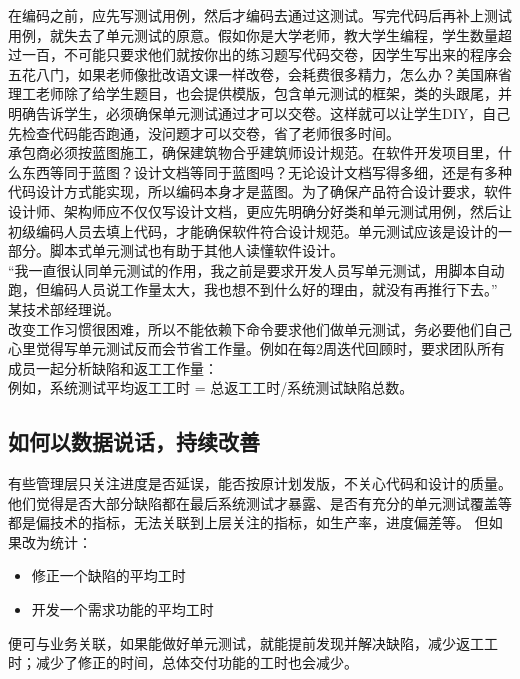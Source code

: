 在编码之前，应先写测试用例，然后才编码去通过这测试。写完代码后再补上测试用例，就失去了单元测试的原意。假如你是大学老师，教大学生编程，学生数量超过一百，不可能只要求他们就按你出的练习题写代码交卷，因学生写出来的程序会五花八门，如果老师像批改语文课一样改卷，会耗费很多精力，怎么办？美国麻省理工老师除了给学生题目，也会提供模版，包含单元测试的框架，类的头跟尾，并明确告诉学生，必须确保单元测试通过才可以交卷。这样就可以让学生DIY，自己先检查代码能否跑通，没问题才可以交卷，省了老师很多时间。\\
承包商必须按蓝图施工，确保建筑物合乎建筑师设计规范。在软件开发项目里，什么东西等同于蓝图？设计文档等同于蓝图吗？无论设计文档写得多细，还是有多种代码设计方式能实现，所以编码本身才是蓝图。为了确保产品符合设计要求，软件设计师、架构师应不仅仅写设计文档，更应先明确分好类和单元测试用例，然后让初级编码人员去填上代码，才能确保软件符合设计规范。单元测试应该是设计的一部分。脚本式单元测试也有助于其他人读懂软件设计。\\
``我一直很认同单元测试的作用，我之前是要求开发人员写单元测试，用脚本自动跑，但编码人员说工作量太大，我也想不到什么好的理由，就没有再推行下去。''
某技术部经理说。\\
改变工作习惯很困难，所以不能依赖下命令要求他们做单元测试，务必要他们自己心里觉得写单元测试反而会节省工作量。例如在每2周迭代回顾时，要求团队所有成员一起分析缺陷和返工工作量：\\
例如，系统测试平均返工工时 = 总返工工时/系统测试缺陷总数。\\

\hypertarget{ux5982ux4f55ux4ee5ux6570ux636eux8bf4ux8bddux6301ux7eedux6539ux5584}{%
\subsection{如何以数据说话，持续改善}\label{ux5982ux4f55ux4ee5ux6570ux636eux8bf4ux8bddux6301ux7eedux6539ux5584}}

有些管理层只关注进度是否延误，能否按原计划发版，不关心代码和设计的质量。他们觉得是否大部分缺陷都在最后系统测试才暴露、是否有充分的单元测试覆盖等都是偏技术的指标，无法关联到上层关注的指标，如生产率，进度偏差等。
但如果改为统计：

\begin{itemize}
\tightlist
\item
  修正一个缺陷的平均工时
\item
  开发一个需求功能的平均工时
\end{itemize}

便可与业务关联，如果能做好单元测试，就能提前发现并解决缺陷，减少返工工时；减少了修正的时间，总体交付功能的工时也会减少。

